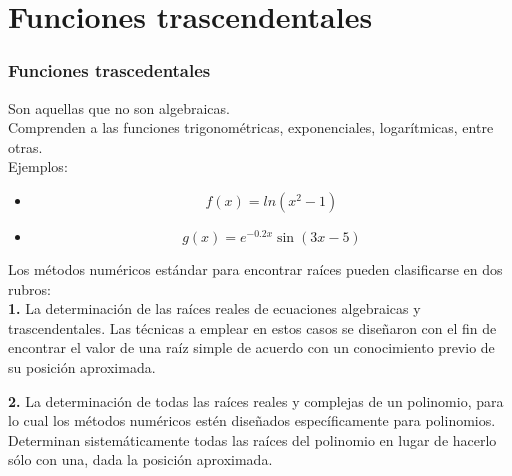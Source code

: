 \section{Funciones trascendentales}
\begin{frame}
\frametitle{Funciones trascedentales}
Son aquellas que no son algebraicas.
\\
\bigskip
Comprenden a las funciones trigonométricas, exponenciales, logarítmicas, entre otras.
\\
\bigskip
Ejemplos:
\begin{itemize}
\item \[ f(x)=ln(x^{2}-1) \]
\item \[g(x)=e^{-0.2x} \sin(3x-5) \]
\end{itemize}
\end{frame}
\begin{frame}
Los métodos numéricos estándar para encontrar raíces pueden clasificarse en dos rubros:
\\
\bigskip
\textbf{1.} La determinación de las raíces reales de ecuaciones algebraicas y trascendentales. Las técnicas a emplear en estos casos se diseñaron con el fin de encontrar el valor de una raíz simple de acuerdo con un conocimiento previo de su posición aproximada.
\end{frame}
\begin{frame}
\textbf{2.} La determinación de todas las raíces reales y complejas de un polinomio, para lo cual los métodos numéricos estén diseñados específicamente para polinomios. 
\\
\bigskip
Determinan sistemáticamente todas las raíces del polinomio en lugar de hacerlo sólo con una, dada la posición aproximada.
\end{frame}
